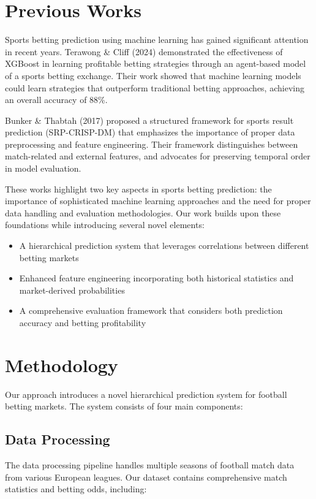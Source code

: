 \documentclass[conference]{IEEEtran}
\begin{document}
\section{Previous Works}
Sports betting prediction using machine learning has gained significant attention in recent years. Terawong \& Cliff (2024) demonstrated the effectiveness of XGBoost in learning profitable betting strategies through an agent-based model of a sports betting exchange. Their work showed that machine learning models could learn strategies that outperform traditional betting approaches, achieving an overall accuracy of 88\%.

Bunker \& Thabtah (2017) proposed a structured framework for sports result prediction (SRP-CRISP-DM) that emphasizes the importance of proper data preprocessing and feature engineering. Their framework distinguishes between match-related and external features, and advocates for preserving temporal order in model evaluation.

These works highlight two key aspects in sports betting prediction: the importance of sophisticated machine learning approaches and the need for proper data handling and evaluation methodologies. Our work builds upon these foundations while introducing several novel elements:

\begin{itemize}
    \item A hierarchical prediction system that leverages correlations between different betting markets
    \item Enhanced feature engineering incorporating both historical statistics and market-derived probabilities
    \item A comprehensive evaluation framework that considers both prediction accuracy and betting profitability
\end{itemize}

\section{Methodology}
Our approach introduces a novel hierarchical prediction system for football betting markets. The system consists of four main components:

\subsection{Data Processing}
The data processing pipeline handles multiple seasons of football match data from various European leagues. Our dataset contains comprehensive match statistics and betting odds, including:
\end{document}
